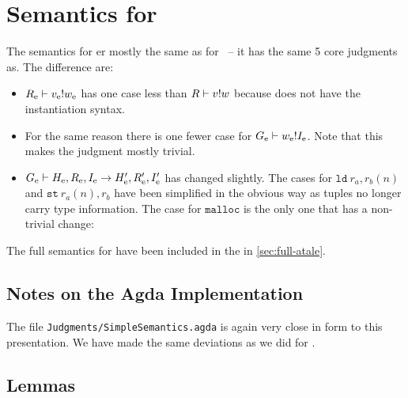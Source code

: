\section{Semantics for \ATALe}

The semantics for \ATALe er mostly the same as for \ATAL\ -- it has the same 5
core judgments as. The difference are:

\begin{itemize}
\item ${R_{\mathrm{e}}} |- {v_{\mathrm{e}}} ! {w_{\mathrm{e}}}$ has one case less than
  ${R} |- {v} ! {w}$ because \ATALe does not have the
  instantiation syntax.
\item For the same reason there is one fewer case for
  ${G_{\mathrm{e}}} |- {w_{\mathrm{e}}} ! {I_{\mathrm{e}}}$. Note that this makes the
  judgment mostly trivial.
\item
  ${G_{\mathrm{e}}} |- {H_{\mathrm{e}}, R_{\mathrm{e}}, I_{\mathrm{e}}} -> {H_{\mathrm{e}}', R_{\mathrm{e}}',
    I_{\mathrm{e}}'}$ has changed slightly. The cases for $\mathtt{ld}\ r_a, r_b(n)$
  and $\mathtt{st}\ r_a(n), r_b$ have been simplified in the obvious way as
  tuples no longer carry type information. The case for $\mathtt{malloc}$ is the
  only one that has a non-trivial change:
\end{itemize}


The full semantics for \ATALe have been included in the in
\cref{sec:full-atale}.

\subsection{Notes on the Agda Implementation}

The file \texttt{Judgments/SimpleSemantics.agda} is again very close in form to
this presentation. We have made the same deviations as we did for \ATAL.

\subsection{Lemmas}

